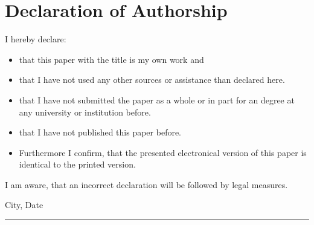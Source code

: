 \clearpage
\chapter*{Declaration of Authorship}
\thispagestyle{scrheadings}



I hereby declare:

\begin{itemize}
	\item that this paper with the title \textit{\dertitel} is my own work and
	\item that I have not used any other sources or assistance than declared here.
	\item that I have not submitted the paper as a whole or in part for an degree at any university
		or institution before.
	\item that I have not published this paper before.
	\item Furthermore I confirm, that the presented electronical version of this paper
		is identical to the printed version.
\end{itemize}
I am aware, that an incorrect declaration will be followed by legal measures.

\vspace{3cm}
City, Date
\vspace{3em}

\rule{6cm}{0.4pt}\\
\derautor
